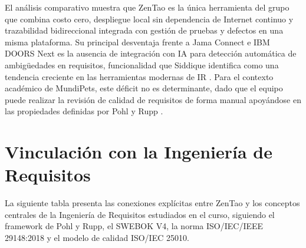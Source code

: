 \documentclass[journal,onecolumn]{IEEEtran}
\begin{document}
El análisis comparativo muestra que ZenTao es la única herramienta del grupo que combina
costo cero, despliegue local sin dependencia de Internet continuo y trazabilidad bidireccional
integrada con gestión de pruebas y defectos en una misma plataforma. Su principal desventaja
frente a Jama Connect e IBM DOORS Next es la ausencia de integración con IA para detección
automática de ambigüedades en requisitos, funcionalidad que Siddique identifica como una
tendencia creciente en las herramientas modernas de IR \cite{siddique2023}. Para el contexto
académico de MundiPets, este déficit no es determinante, dado que el equipo puede realizar
la revisión de calidad de requisitos de forma manual apoyándose en las propiedades definidas
por Pohl y Rupp \cite{pohl2015}.


\newpage

\section{Vinculación con la Ingeniería de Requisitos}

La siguiente tabla presenta las conexiones explícitas entre ZenTao y los conceptos centrales
de la Ingeniería de Requisitos estudiados en el curso, siguiendo el framework de Pohl y Rupp,
el SWEBOK V4, la norma ISO/IEC/IEEE 29148:2018 y el modelo de calidad ISO/IEC 25010.
\end{document}
